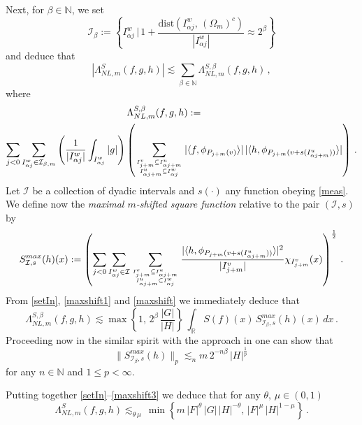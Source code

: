 \documentclass[a4paper,reqno]{amsart}
\numberwithin{equation}{section}
\theoremstyle{definition}
\newcommand{\R}{\mathbb{R}}
\newcommand{\N}{\mathbb{N}}
\def\a{\alpha}
\def\b{\beta}
\def\L{\Lambda}
\def\O{\Omega}
\def\I{\mathcal{I}}
\begin{document}
Next, for $\b\in\N$, we set
\begin{equation}\label{setIn}
\I_{\b}:=\left\{I_{\a j}^w\,\Big|\,1+\frac{\textrm{dist} (I_{\a j}^w,\,(\O_{m})^c) }{|I_{\a j}^w|}\approx 2^{\b}\right\}
\end{equation}
and deduce that
\begin{equation}\label{lslrealn}
|\L^{S}_{NL,m}(f,g,h)|\lesssim\sum_{\b\in\N} \L^{S,\b}_{NL,m}(f,g,h)\,,
\end{equation}
where
\begin{align}\label{maxshift1}
\L^{S,\b}_{NL,m}(f,g,h):=\qquad\qquad\qquad\qquad\qquad\qquad\qquad\qquad\nonumber\\
\sum_{j<0}\sum_{I_{\a j}^w\in \I_{\b,m}}
\left(\frac{1}{|I_{\a j}^w|} \int_{I_{\a j}^{w}}|g|\right)
\left(\sum_{{I_{j+m}^v\subseteq I_{\a j+ m}^u}\atop{I_{\a j+ m}^u}\subseteq I_{\a j}^w}
|\langle f,  \phi_{P_{j+m}(v)}\rangle|\,|\langle h,  \phi_{P_{j+m}(v+s(I_{\a j+ m}^u))}\rangle|\right)\,.
\end{align}
Let $\I$ be a collection of dyadic intervals and $s(\cdot)$ any function obeying \eqref{meas}. We define now the \emph{maximal $m$-shifted square function} relative to the pair $(\I,s)$ by
\begin{equation}\label{maxshift}
 S_{\I,s}^{max}(h)(x):=\left(\sum_{j<0}\sum_{I_{\a j}^w\in \I}
\sum_{{I_{j+m}^v\subseteq I_{\a j+ m}^u}\atop{I_{\a j+ m}^u}\subseteq I_{\a j}^w}
\frac{|\langle h,  \phi_{P_{j+m}(v+s(I_{\a j+ m}^u))}\rangle|^2}{|I_{j+m}^v|}\chi_{I_{j+m}^v}(x)\right)^{\frac{1}{2}}\,.
\end{equation}
From \eqref{setIn}, \eqref{maxshift1} and \eqref{maxshift} we immediately deduce that
\begin{equation}\label{maxshift2}
\L^{S,\b}_{NL,m}(f,g,h)\lesssim \max\left\{1,\,2^{\b}\,\frac{|G|}{|H|}\right\}\,\int_{\R} S(f)(x)\,S_{\I_{\b},s}^{max}(h)(x)\,dx\,.
\end{equation}
Proceeding now in the similar spirit with the approach in \cite{Lie18} one can show that
\begin{equation}\label{maxshift3}
\|S_{\I_{\b},s}^{max}(h)\|_{p}\lesssim_{n} m\, 2^{-n\b}\,|H|^{\frac{1}{p}}\,
\end{equation}
for any $n\in\N$ and $1\leq p<\infty$.

Putting together \eqref{setIn}--\eqref{maxshift3} we deduce that for any $\theta,\,\mu\in (0,1)$
\begin{equation}\label{keyn02}
\L^{S}_{NL,m}(f,g,h)\lesssim_{\theta\,\mu}\,\min\left\{m\,|F|^{\theta}\,|G|\,|H|^{-\theta},\,|F|^{\mu}\,|H|^{1-\mu}\right\}\,.
\end{equation}
\end{document}
